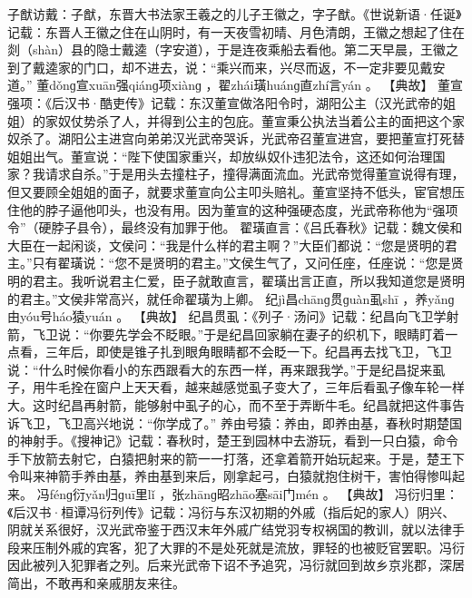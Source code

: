 \documentclass[12pt,UTF8]{ctexbook}
\begin{document}
子猷访戴：子猷，东晋大书法家王羲之的儿子王徽之，字子猷。《世说新语·任诞》记载：东晋人王徽之住在山阴时，有一天夜雪初晴、月色清朗，王徽之想起了住在剡（shàn）县的隐士戴逵（字安道），于是连夜乘船去看他。第二天早晨，王徽之到了戴逵家的门口，却不进去，说：“乘兴而来，兴尽而返，不一定非要见戴安道。”
董dǒnɡ宣xuān强qiánɡ项xiànɡ
，翟zhái璜huánɡ直zhí言yán
。
【典故】
董宣强项：《后汉书·酷吏传》记载：东汉董宣做洛阳令时，湖阳公主（汉光武帝的姐姐）的家奴仗势杀了人，并得到公主的包庇。董宣秉公执法当着公主的面把这个家奴杀了。湖阳公主进宫向弟弟汉光武帝哭诉，光武帝召董宣进宫，要把董宣打死替姐姐出气。董宣说：“陛下使国家重兴，却放纵奴仆违犯法令，这还如何治理国家？我请求自杀。”于是用头去撞柱子，撞得满面流血。光武帝觉得董宣说得有理，但又要顾全姐姐的面子，就要求董宣向公主叩头赔礼。董宣坚持不低头，宦官想压住他的脖子逼他叩头，也没有用。因为董宣的这种强硬态度，光武帝称他为“强项令”（硬脖子县令），最终没有加罪于他。
翟璜直言：《吕氏春秋》记载：魏文侯和大臣在一起闲谈，文侯问：“我是什么样的君主啊？”大臣们都说：“您是贤明的君主。”只有翟璜说：“您不是贤明的君主。”文侯生气了，又问任座，任座说：“您是贤明的君主。我听说君主仁爱，臣子就敢直言，翟璜出言正直，所以我知道您是贤明的君主。”文侯非常高兴，就任命翟璜为上卿。
纪jì昌chānɡ贯ɡuàn虱shī
，养yǎnɡ由yóu号háo猿yuán
。
【典故】
纪昌贯虱：《列子·汤问》记载：纪昌向飞卫学射箭，飞卫说：“你要先学会不眨眼。”于是纪昌回家躺在妻子的织机下，眼睛盯着一点看，三年后，即使是锥子扎到眼角眼睛都不会眨一下。纪昌再去找飞卫，飞卫说：“什么时候你看小的东西跟看大的东西一样，再来跟我学。”于是纪昌捉来虱子，用牛毛拴在窗户上天天看，越来越感觉虱子变大了，三年后看虱子像车轮一样大。这时纪昌再射箭，能够射中虱子的心，而不至于弄断牛毛。纪昌就把这件事告诉飞卫，飞卫高兴地说：“你学成了。”
养由号猿：养由，即养由基，春秋时期楚国的神射手。《搜神记》记载：春秋时，楚王到园林中去游玩，看到一只白猿，命令手下放箭去射它，白猿把射来的箭一一打落，还拿着箭开始玩起来。于是，楚王下令叫来神箭手养由基，养由基到来后，刚拿起弓，白猿就抱住树干，害怕得惨叫起来。
冯fénɡ衍yǎn归ɡuī里lǐ
，张zhānɡ昭zhāo塞sāi门mén
。
【典故】
冯衍归里：《后汉书·桓谭冯衍列传》记载：冯衍与东汉初期的外戚（指后妃的家人）阴兴、阴就关系很好，汉光武帝鉴于西汉末年外戚广结党羽专权祸国的教训，就以法律手段来压制外戚的宾客，犯了大罪的不是处死就是流放，罪轻的也被贬官罢职。冯衍因此被列入犯罪者之列。后来光武帝下诏不予追究，冯衍就回到故乡京兆郡，深居简出，不敢再和亲戚朋友来往。
\end{document}
